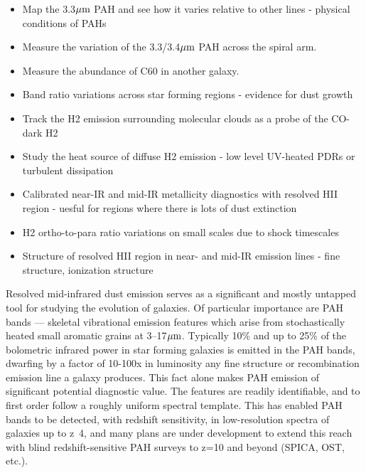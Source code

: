 \documentclass[12pt]{article}
\begin{document}
\vspace{0.1in}


\begin{itemize}
    \item{Map the 3.3$\hbox{$\mu$m}$ PAH and see how it varies relative to other lines - physical conditions of PAHs}\vspace{-0.1in}
    \item{Measure the variation of the 3.3/3.4$\hbox{$\mu$m}$ PAH across the spiral arm.}\vspace{-0.1in}
    \item{Measure the abundance of C60 in another galaxy.}\vspace{-0.1in}
    \item{Band ratio variations across star forming regions - evidence for dust growth}\vspace{-0.1in}
    \item{Track the H2 emission surrounding molecular clouds as a probe of the CO-dark H2}\vspace{-0.1in}
    \item{Study the heat source of diffuse H2 emission - low level UV-heated PDRs or turbulent dissipation}\vspace{-0.1in}
    \item{Calibrated near-IR and mid-IR metallicity diagnostics with resolved HII region - uesful for regions where there is lots of dust extinction}\vspace{-0.1in}
    \item{H2 ortho-to-para ratio variations on small scales due to shock timescales}\vspace{-0.1in}
    \item{Structure of resolved HII region in near- and mid-IR emission lines - fine structure, ionization structure}
\end{itemize}

Resolved mid-infrared dust emission serves as a significant and mostly untapped tool for studying the evolution of galaxies. Of particular importance are PAH bands — skeletal vibrational emission features which arise from stochastically heated small aromatic grains at 3–17$\hbox{$\mu$m}$. Typically 10\% and up to 25\% of the bolometric infrared power in star forming galaxies is emitted in the PAH bands, dwarfing by a factor of 10-100x in luminosity any fine structure or recombination emission line a galaxy produces.  This fact alone makes PAH emission of significant potential diagnostic value.  The features are readily identifiable, and to first order follow a roughly uniform spectral template.  This has enabled PAH bands to be detected, with redshift sensitivity, in low-resolution spectra of galaxies up to z~4, and many plans are under development to extend this reach with blind redshift-sensitive PAH surveys to z=10 and beyond (SPICA, OST, etc.).   
\end{document}
